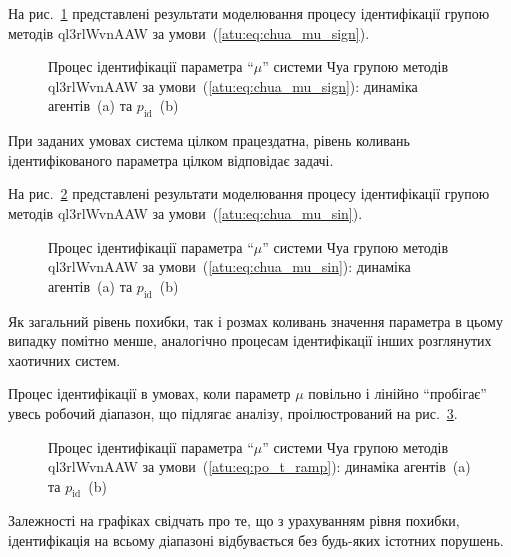На рис.~\ref{atu:f:chua_id_ql3rlWvnAAW_sign} представлені результати
моделювання процесу ідентифікації групою методів ql3rlWvnAAW за
умови~(\ref{atu:eq:chua_mu_sign}).

\begin{figure}[htb!]
  \caption{Процес ідентифікації параметра ``$\mu$'' системи Чуа групою методів ql3rlWvnAAW за умови~(\ref{atu:eq:chua_mu_sign}): динаміка агентів~(a) та $p_\mathrm{id}$~(b)}
  \label{atu:f:chua_id_ql3rlWvnAAW_sign}
\end{figure}

При заданих умовах система цілком працездатна, рівень коливань
ідентифікованого параметра цілком відповідає задачі.

На рис.~\ref{atu:f:chua_id_ql3rlWvnAAW_sin} представлені результати
моделювання процесу ідентифікації групою методів ql3rlWvnAAW за
умови~(\ref{atu:eq:chua_mu_sin}).

\begin{figure}[htb!]
  \caption{Процес ідентифікації параметра ``$\mu$'' системи Чуа групою методів ql3rlWvnAAW за умови~(\ref{atu:eq:chua_mu_sin}): динаміка агентів~(a) та $p_\mathrm{id}$~(b)}
\label{atu:f:chua_id_ql3rlWvnAAW_sin}
\end{figure}

Як загальний рівень похибки, так і розмах коливань значення
параметра в цьому випадку помітно менше, аналогічно процесам
ідентифікації інших розглянутих хаотичних систем.

Процес ідентифікації в умовах, коли параметр
$ \mu $ повільно і лінійно ``пробігає'' увесь робочий
діапазон, що підлягає аналізу, проілюстрований на рис.~\ref{atu:f:chua_id_ql3rlWvnAAW_ramp}.

\begin{figure}[htb!]
  \caption{Процес ідентифікації параметра ``$\mu$'' системи Чуа групою методів ql3rlWvnAAW за умови~(\ref{atu:eq:po_t_ramp}): динаміка агентів~(a) та $p_\mathrm{id}$~(b)}
\label{atu:f:chua_id_ql3rlWvnAAW_ramp}
\end{figure}

Залежності на графіках свідчать про те, що з урахуванням рівня
похибки, ідентифікація на всьому діапазоні відбувається без
будь-яких істотних порушень.


